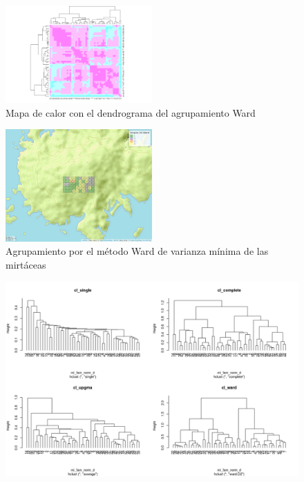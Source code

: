 \documentclass[11pt,]{article}
\begin{document}
\begin{figure}
\centering
\includegraphics[width=0.50000\textwidth]{Mapadecalor_Ward_aa2.png}
\caption{Mapa de calor con el dendrograma del agrupamiento Ward
\label{fig:mapadecalor_ward}}
\end{figure}

\begin{figure}
\centering
\includegraphics[width=0.50000\textwidth]{mapa_ward_k4.png}
\caption{Agrupamiento por el método Ward de varianza mínima de las
mirtáceas \label{fig:mapa_ward}}
\end{figure}

\begin{figure}
\centering
\includegraphics{metodosdeagrupamiento.png}
\caption{\label{fig:metodosdeagrupamiento}}
\end{figure}
\end{document}
